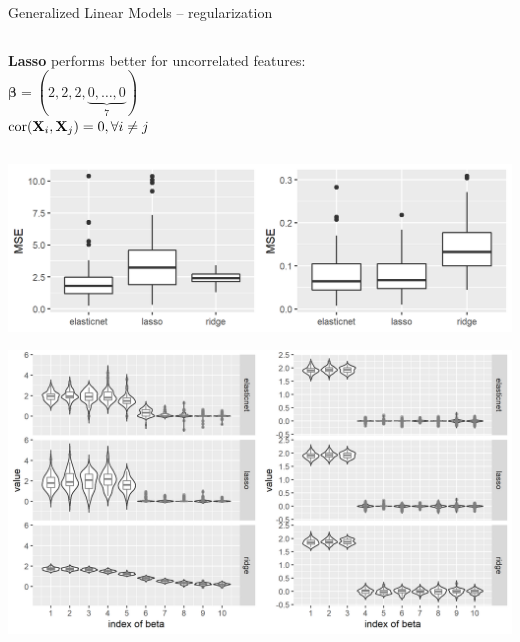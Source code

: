 \begin{frame}{Generalized Linear Models -- regularization}
\begin{columns}[T, totalwidth=\textwidth]
\begin{column}{0.38\textwidth}
\begin{columns}[T, totalwidth=\textwidth]
\begin{column}{0.5\textwidth}
\begin{center}
\textbf{Lasso} performs better for uncorrelated features: \\
\medskip
$\boldsymbol{\beta}=(2, 2, 2,\underbrace{0,\ldots,0}_{7})$ \\
$\operatorname{cor}(\mathbf{X}_{i},\mathbf{X}_{j})= 0, \forall i \neq j$
\end{center}
\end{column}
\end{columns}



          \includegraphics[width=\textwidth]{figure/enet_lasso_ridge_mse.png}
          
          \includegraphics[width=\textwidth]{figure/enet_tradeoff.png}
\end{column}

\end{columns}

\end{frame}


